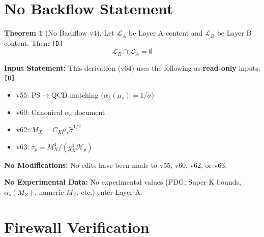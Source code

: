 \documentclass[11pt,a4paper]{article}
\newcommand{\tagD}{\textcolor{green!50!black}{\texttt{[D]}}}
\theoremstyle{definition}
\newtheorem{theorem}{Theorem}[section]
\begin{document}
\section{No Backflow Statement}
\label{sec:no-backflow}

\begin{nobackflowbox}
\begin{theorem}[No Backflow v4]
\label{thm:no-backflow}
Let $\mathcal{L}_A$ be Layer A content and $\mathcal{L}_B$ be Layer B content. Then: \tagD{}
\begin{equation}
\label{eq:no-backflow}
\boxed{\mathcal{L}_B \cap \mathcal{L}_A = \emptyset}
\end{equation}
\end{theorem}

\textbf{Input Statement:} This derivation (v64) uses the following as
\textbf{read-only} inputs: \tagD{}
\begin{itemize}
  \item v55: PS$\to$QCD matching ($\alpha_3(\mu_*) = 1/\tilde{\sigma}$)
  \item v60: Canonical $\alpha_3$ document
  \item v62: $M_X = C_X \mu_* \tilde{\sigma}^{1/2}$
  \item v63: $\tau_p = M_X^4/(g_X^4 \mathcal{H}_p)$
\end{itemize}

\textbf{No Modifications:} No edits have been made to v55, v60, v62, or v63.

\textbf{No Experimental Data:} No experimental values (PDG, Super-K bounds,
$\alpha_s(M_Z)$, numeric $M_Z$, etc.) enter Layer A.
\end{nobackflowbox}

\section{Firewall Verification}
\label{sec:firewall}
\end{document}
